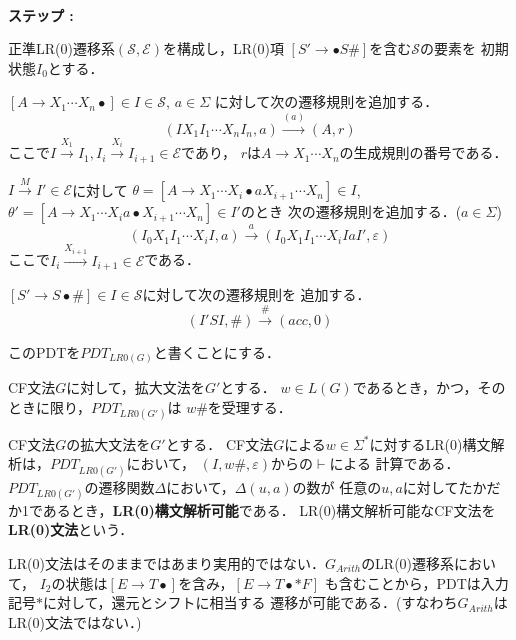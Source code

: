 \documentclass[dvipdfmx,a4j]{jbook}
\newcounter{coffee}
\begin{document}
\begin{Alg}\label{PDTLR0}\ 
\begin{list}{{\rm\bf ステップ :}}{}
  \item 正準LR(0)遷移系$(\mathcal{S},\mathcal{E})$を構成し，LR(0)項
  $[S'\rightarrow\bullet S\texttt{\#}]$を含む$\mathcal{S}$の要素を
  初期状態$I_0$とする．
  \item $[A\rightarrow X_1\cdots X_n\bullet]\in I\in\mathcal{S}$, $a\in\Sigma$
  に対して次の遷移規則を追加する．
  \[(IX_1I_1\cdots X_nI_n,a)\xrightarrow{(a)}(A,r)\]
  ここで$I\xrightarrow{X_1}I_1,I_i\xrightarrow{X_i}I_{i+1}\in\mathcal{E}$であり，
  $r$は$A\rightarrow X_1\cdots X_n$の生成規則の番号である．
  \item $I\xrightarrow{M}I'\in\mathcal{E}$に対して 
  $\theta=[A\rightarrow X_1\cdots X_i\bullet a X_{i+1}\cdots X_n]\in I$,
  $\theta'=[A\rightarrow X_1\cdots X_i a\bullet X_{i+1}\cdots X_n]\in I'$のとき
  次の遷移規則を追加する．($a\in\Sigma$)
  \[(I_0X_1I_1\cdots X_iI,a)\xrightarrow{a}(I_0X_1I_1\cdots X_iIaI',\varepsilon)\]
  ここで$I_i\xrightarrow{X_{i+1}}I_{i+1}\in\mathcal{E}$である．
  \item $[S'\rightarrow S\bullet\texttt{\#}]\in I\in\mathcal{S}$に対して次の遷移規則を
  追加する．
  \[(I'SI,\texttt{\#})\xrightarrow{\texttt{\#}}(acc,0)\]
\end{list}
\end{Alg}

このPDTを$PDT_{LR0(G)}$と書くことにする．
\begin{Prop}
  CF文法$G$に対して，拡大文法を$G'$とする．
  $w\in L(G)$であるとき，かつ，そのときに限り，$PDT_{LR0(G')}$は
  $w\texttt{\#}$を受理する．
\end{Prop}

\begin{Def}
  CF文法$G$の拡大文法を$G'$とする．
  CF文法$G$による$w\in\Sigma^\ast$に対するLR(0)構文解析は，$PDT_{LR0(G')}$において，
  $(I,w\texttt{\#},\varepsilon)$からの$\vdash$による
  計算である．
  $PDT_{LR0(G')}$の遷移関数$\Delta$において，$\Delta(u,a)$の数が
  任意の$u,a$に対してたかだか1であるとき，{\bf LR(0)構文解析可能}である．
  LR(0)構文解析可能なCF文法を{\bf LR(0)文法}という．
\end{Def}

LR(0)文法はそのままではあまり実用的ではない．$G_{Arith}$のLR(0)遷移系において，
$I_2$の状態は$[E\rightarrow T\bullet]$を含み，$[E\rightarrow T\bullet\texttt{*}F]$
も含むことから，PDTは入力記号$\texttt{*}$に対して，還元とシフトに相当する
遷移が可能である．(すなわち$G_{Arith}$はLR(0)文法ではない．)
\end{document}
